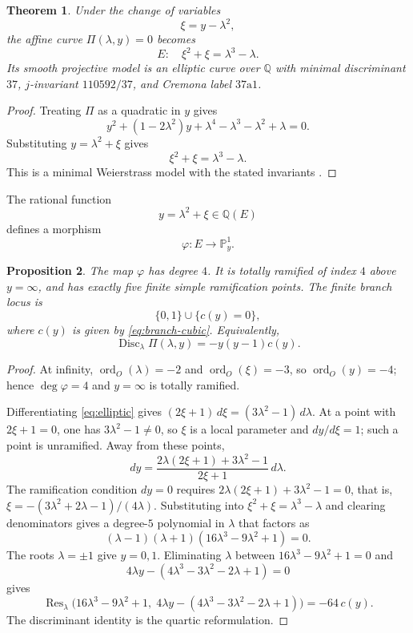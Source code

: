 \documentclass[11pt,letterpaper]{article}
\theoremstyle{plain}
\newtheorem{theorem}{Theorem}[section]
\newtheorem{proposition}[theorem]{Proposition}
\theoremstyle{remark}
\newcommand{\QQ}{\mathbb{Q}}
\newcommand{\PP}{\mathbb{P}}
\newcommand{\Disc}{\operatorname{Disc}}
\newcommand{\Res}{\operatorname{Res}}
\begin{document}
\begin{theorem}\label{thm:elliptic}
Under the change of variables
\[
\xi=y-\lambda^2,
\]
the affine curve \(\Pi(\lambda,y)=0\) becomes
\begin{equation}\label{eq:elliptic}
E:\quad \xi^2+\xi=\lambda^3-\lambda.
\end{equation}
Its smooth projective model is an elliptic curve over \(\QQ\) with minimal discriminant \(37\), \(j\)-invariant \(110592/37\), and Cremona label \(37\mathrm{a}1\).
\end{theorem}

\begin{proof}
Treating \(\Pi\) as a quadratic in \(y\) gives
\[
y^2+(1-2\lambda^2)y+\lambda^4-\lambda^3-\lambda^2+\lambda=0.
\]
Substituting \(y=\lambda^2+\xi\) gives
\[
\xi^2+\xi=\lambda^3-\lambda.
\]
This is a minimal Weierstrass model with the stated invariants \cite{Silverman2009,LMFDBEllipticCurve37a1}.
\end{proof}

The rational function
\begin{equation}\label{eq:y-function}
y=\lambda^2+\xi\in \QQ(E)
\end{equation}
defines a morphism
\[
\varphi:E\longrightarrow \PP^1_y.
\]

\begin{proposition}\label{prop:ramification}
The map \(\varphi\) has degree \(4\). It is totally ramified of index \(4\) above \(y=\infty\), and has exactly five finite simple ramification points. The finite branch locus is
\[
\{0,1\}\cup\{c(y)=0\},
\]
where \(c(y)\) is given by \eqref{eq:branch-cubic}. Equivalently,
\[
\Disc_\lambda \Pi(\lambda,y)=-y(y-1)c(y).
\]
\end{proposition}

\begin{proof}
At infinity, \(\operatorname{ord}_O(\lambda)=-2\) and \(\operatorname{ord}_O(\xi)=-3\), so \(\operatorname{ord}_O(y)=-4\); hence \(\deg\varphi=4\) and \(y=\infty\) is totally ramified.

Differentiating \eqref{eq:elliptic} gives \((2\xi+1)\,d\xi=(3\lambda^2-1)\,d\lambda\). At a point with \(2\xi+1=0\), one has \(3\lambda^2-1\neq0\), so \(\xi\) is a local parameter and \(dy/d\xi=1\); such a point is unramified. Away from these points,
\[
dy=\frac{2\lambda(2\xi+1)+3\lambda^2-1}{2\xi+1}\,d\lambda.
\]
The ramification condition \(dy=0\) requires \(2\lambda(2\xi+1)+3\lambda^2-1=0\), that is, \(\xi=-(3\lambda^2+2\lambda-1)/(4\lambda)\). Substituting into \(\xi^2+\xi=\lambda^3-\lambda\) and clearing denominators gives a degree-\(5\) polynomial in \(\lambda\) that factors as
\[
(\lambda-1)(\lambda+1)(16\lambda^3-9\lambda^2+1)=0.
\]
The roots \(\lambda=\pm 1\) give \(y=0,1\). Eliminating \(\lambda\) between \(16\lambda^3-9\lambda^2+1=0\) and
\[
4\lambda y-(4\lambda^3-3\lambda^2-2\lambda+1)=0
\]
gives
\[
\Res_\lambda\!\bigl(16\lambda^3-9\lambda^2+1,\;4\lambda y-(4\lambda^3-3\lambda^2-2\lambda+1)\bigr)=-64\,c(y).
\]
The discriminant identity is the quartic reformulation.
\end{proof}
\end{document}
